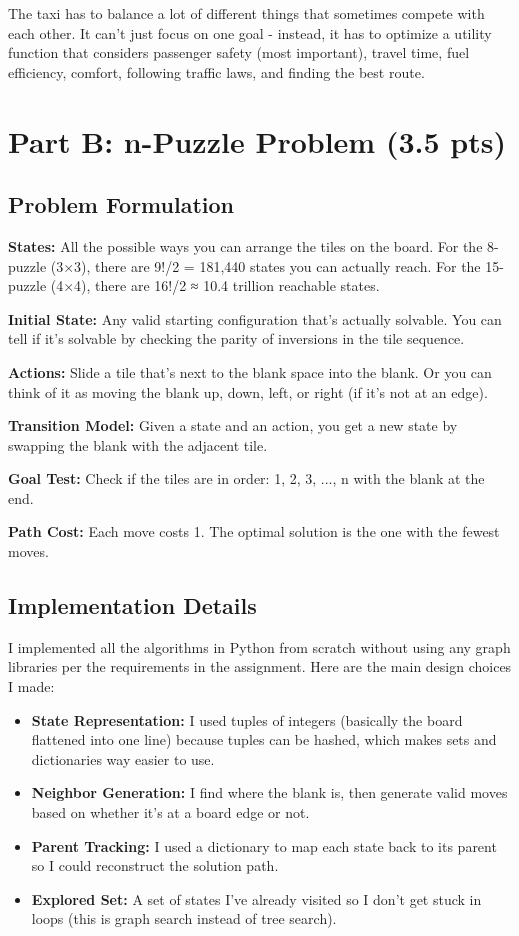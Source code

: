 \documentclass[letterpaper]{article}
\begin{document}
The taxi has to balance a lot of different things that sometimes compete with each other. It can't just focus on one goal - instead, it has to optimize a utility function that considers passenger safety (most important), travel time, fuel efficiency, comfort, following traffic laws, and finding the best route.

\section{Part B: n-Puzzle Problem (3.5 pts)}

\subsection{Problem Formulation}

\textbf{States:} All the possible ways you can arrange the tiles on the board. For the 8-puzzle (3×3), there are 9!/2 = 181,440 states you can actually reach. For the 15-puzzle (4×4), there are 16!/2 ≈ 10.4 trillion reachable states.

\textbf{Initial State:} Any valid starting configuration that's actually solvable. You can tell if it's solvable by checking the parity of inversions in the tile sequence.

\textbf{Actions:} Slide a tile that's next to the blank space into the blank. Or you can think of it as moving the blank up, down, left, or right (if it's not at an edge).

\textbf{Transition Model:} Given a state and an action, you get a new state by swapping the blank with the adjacent tile.

\textbf{Goal Test:} Check if the tiles are in order: 1, 2, 3, ..., n with the blank at the end.

\textbf{Path Cost:} Each move costs 1. The optimal solution is the one with the fewest moves.

\subsection{Implementation Details}

I implemented all the algorithms in Python from scratch without using any graph libraries per the requirements in the assignment. Here are the main design choices I made:

\begin{itemize}
    \item \textbf{State Representation:} I used tuples of integers (basically the board flattened into one line) because tuples can be hashed, which makes sets and dictionaries way easier to use.
    \item \textbf{Neighbor Generation:} I find where the blank is, then generate valid moves based on whether it's at a board edge or not.
    \item \textbf{Parent Tracking:} I used a dictionary to map each state back to its parent so I could reconstruct the solution path.
    \item \textbf{Explored Set:} A set of states I've already visited so I don't get stuck in loops (this is graph search instead of tree search).
\end{itemize}
\end{document}
